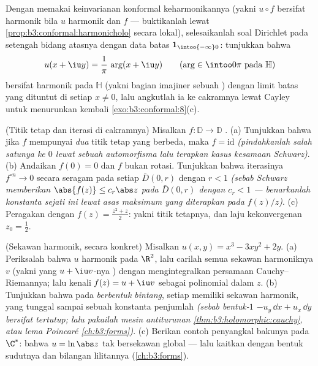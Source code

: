 \begin{exercise}[$\star\star$]\label{exo:b3:conformal:10}
Dengan memakai keinvarianan konformal keharmonikannya (yakni $u\circ f$ bersifat
harmonik bila $u$ harmonik dan $f$  --- buktikanlah
lewat \cref{prop:b3:conformal:harmonicholo} secara lokal), selesaikanlah
soal Dirichlet pada setengah bidang atasnya dengan data batas
$\mathbf 1_{\intoo{-\infty}0}$: tunjukkan bahwa
\[
u(x + \iu y) = \frac1\pi\,\arg(x + \iu y)
\qquad (\arg \in \intoo0\pi \text{ pada } \mathbb H)
\]
bersifat harmonik pada $\mathbb H$ (yakni bagian imajiner sebuah ) dengan limit batas yang dituntut di setiap $x \neq
0$, lalu angkutlah ia ke cakramnya lewat Cayley untuk menurunkan kembali
\cref{exo:b3:conformal:8}(c).
\end{exercise}

\begin{exercise}[$\star\star$]\label{exo:b3:conformal:11}
(Titik tetap dan iterasi di cakramnya) Misalkan $f\colon\mathbb
D \to \mathbb D$ .
(a) Tunjukkan bahwa jika $f$ mempunyai \emph{dua} titik tetap yang berbeda,
maka $f = \mathrm{id}$ \emph{(pindahkanlah salah satunya ke $0$ lewat sebuah
automorfisma lalu terapkan kasus kesamaan Schwarz)}.
(b) Andaikan $f(0) = 0$ dan $f$ bukan rotasi. Tunjukkan bahwa
iterasinya $f^{\circ n} \to 0$ secara seragam pada setiap 
$\bar D(0, r)$ dengan $r < 1$ \emph{(sebab Schwarz memberikan $\abs{f(z)}
\leq c_r\abs z$ pada $\bar D(0,r)$ dengan $c_r < 1$ --- benarkanlah
konstanta sejati ini lewat asas maksimum yang diterapkan pada
$f(z)/z$)}.
(c) Peragakan dengan $f(z) = \frac{z^2 + z}2$: yakni titik tetapnya,
dan laju kekonvergenan  $z_0 =
\frac12$.
\end{exercise}

\begin{exercise}[$\star\star$]\label{exo:b3:conformal:12}
(Sekawan harmonik, secara konkret) Misalkan $u(x, y) = x^3 - 3xy^2
+ 2y$.
(a) Periksalah bahwa $u$ harmonik pada $\R^2$, lalu carilah semua
sekawan harmoniknya $v$ (yakni yang $u + \iu v$-nya ) dengan
mengintegralkan persamaan Cauchy--Riemannya; lalu kenali $f(z) =
u + \iu v$ sebagai polinomial dalam $z$.
(b) Tunjukkan bahwa pada  \emph{berbentuk bintang}, setiap
 memiliki sekawan harmonik, yang tunggal sampai
sebuah konstanta penjumlah \emph{(sebab bentuk-$1$ $-u_y\,\dd x +
u_x\,\dd y$ bersifat tertutup; lalu pakailah mesin antiturunan
\cref{thm:b3:holomorphic:cauchy}, atau lema Poincaré
\cref{ch:b3:forms})}.
(c) Berikan contoh penyangkal bakunya pada
$\C^*$: bahwa $u = \ln\abs z$ tak bersekawan global --- lalu kaitkan
dengan bentuk sudutnya dan bilangan lilitannya
(\cref{ch:b3:forms}).
\end{exercise}

